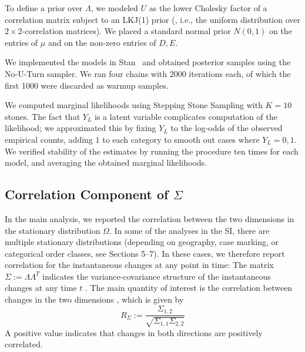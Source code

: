 \documentclass[11pt,a4paper]{article}
\begin{document}
To define a prior over $\Lambda$, we modeled $U$ as the lower Cholesky factor of a correlation matrix subject to an LKJ(1) prior (\citet{lewandowski2009generating}, i.e., the uniform distribution over $2\times 2$-correlation matrices).
We placed a standard normal prior $N(0,1)$ on the entries of $\mu$ and on the non-zero entries of $D, E$.

We implemented the models in Stan~\citep{carpenter2017stan} and obtained posterior samples using the No-U-Turn sampler.
We ran four chains with 2000 iterations each, of which the first 1000 were discarded as warmup samples.

We computed marginal likelihoods using Stepping Stone Sampling \citep{xie2011improving} with $K=10$ stones.
The fact that $Y_L$ is a latent variable complicates computation of the likelihood; we approximated this by fixing $Y_L$ to the log-odds of the observed empirical counts, adding $1$ to each category to smooth out cases where $Y_L =0,1$.
We verified stability of the estimates by running the procedure ten times for each model, and averaging the obtained marginal likelihoods.


\subsection{Correlation Component of $\Sigma$}\label{sec:instant-corr}
In the main analysis, we reported the correlation between the two dimensions in the stationary distribution $\Omega$.
In some of the analyses in the SI, there are multiple stationary distributions (depending on geography, case marking, or categorical order classes, see Sections 5--7).
In these cases, we therefore report correlation for the instantaneous changes at any point in time:
The matrix $\Sigma := \Lambda\Lambda^T$ indicates the variance-covariance structure of the instantaneous changes at any time $t$ \citep{felsenstein1973maximum, freckleton2012fast}.
The main quantity of interest is the correlation between changes in the two dimensions \citep[cf.][]{felsenstein1973maximum,freckleton2012fast}, which is given by
\begin{equation}
R_\Sigma := \frac{\Sigma_{1,2}}{\sqrt{\Sigma_{1,1}\Sigma_{2,2}}}
\end{equation}
A positive value indicates that changes in both directions are positively correlated.

\end{document}
